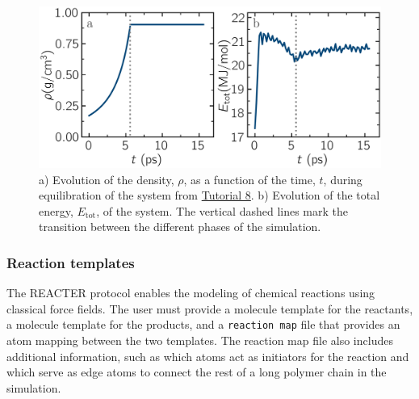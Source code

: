 \documentclass[9pt,tutorial]{livecoms}
\newcommand{\flecmd}[1]{\textcolor{command}{\texttt{#1}}} %
\begin{document}
\begin{figure}
\centering
\includegraphics[width=\linewidth]{REACT-mixing}
\caption{a) Evolution of the density, $\rho$, as a function of the
time, $t$, during equilibration of the system from \hyperref[bond-react-label]{Tutorial 8}.
b) Evolution of the total energy, $E_\text{tot}$, of the system.
The vertical dashed lines mark the transition between the different
phases of the simulation.}
\label{fig:evolution-density}
\end{figure}

\subsubsection{Reaction templates}

The REACTER protocol enables the modeling of chemical reactions using
classical force fields.  The user must provide a molecule template for the reactants,
a molecule template for the products, and a \flecmd{reaction map} file that
provides an atom mapping between the two templates.  The reaction map file also includes
additional information, such as which atoms act as initiators for the reaction and which
serve as edge atoms to connect the rest of a long polymer chain in the simulation.
\end{document}

